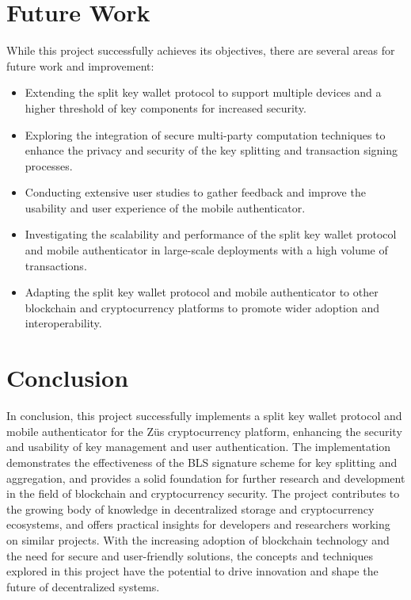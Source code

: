 \section{Future Work}
While this project successfully achieves its objectives, there are several areas for future work and improvement:
\begin{itemize}
\item Extending the split key wallet protocol to support multiple devices and a higher threshold of key components for increased security.
\item Exploring the integration of secure multi-party computation techniques to enhance the privacy and security of the key splitting and transaction signing processes.
\item Conducting extensive user studies to gather feedback and improve the usability and user experience of the mobile authenticator.
\item Investigating the scalability and performance of the split key wallet protocol and mobile authenticator in large-scale deployments with a high volume of transactions.
\item Adapting the split key wallet protocol and mobile authenticator to other blockchain and cryptocurrency platforms to promote wider adoption and interoperability.
\end{itemize}
\section{Conclusion}
In conclusion, this project successfully implements a split key wallet protocol and mobile authenticator for the Züs cryptocurrency platform, enhancing the security and usability of key management and user authentication. The implementation demonstrates the effectiveness of the BLS signature scheme for key splitting and aggregation, and provides a solid foundation for further research and development in the field of blockchain and cryptocurrency security.
The project contributes to the growing body of knowledge in decentralized storage and cryptocurrency ecosystems, and offers practical insights for developers and researchers working on similar projects. With the increasing adoption of blockchain technology and the need for secure and user-friendly solutions, the concepts and techniques explored in this project have the potential to drive innovation and shape the future of decentralized systems.
